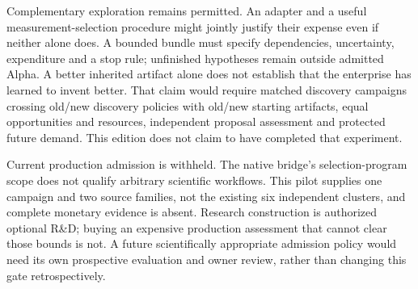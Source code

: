 Complementary exploration remains permitted. An adapter and a useful measurement-selection procedure might jointly justify their expense even if neither alone does. A bounded bundle must specify dependencies, uncertainty, expenditure and a stop rule; unfinished hypotheses remain outside admitted Alpha. A better inherited artifact alone does not establish that the enterprise has learned to invent better. That claim would require matched discovery campaigns crossing old/new discovery policies with old/new starting artifacts, equal opportunities and resources, independent proposal assessment and protected future demand. This edition does not claim to have completed that experiment.

Current production admission is withheld. The native bridge's selection-program scope does not qualify arbitrary scientific workflows. This pilot supplies one campaign and two source families, not the existing six independent clusters, and complete monetary evidence is absent. Research construction is authorized optional R\&D; buying an expensive production assessment that cannot clear those bounds is not. A future scientifically appropriate admission policy would need its own prospective evaluation and owner review, rather than changing this gate retrospectively.
